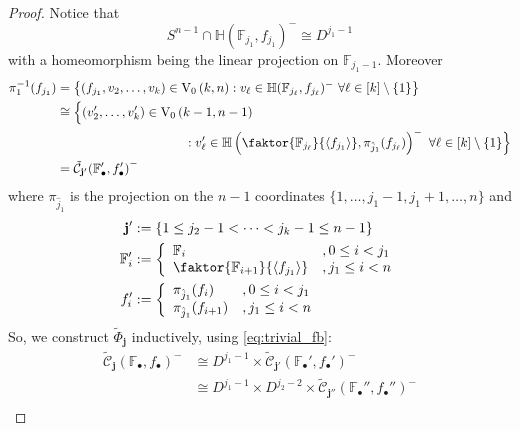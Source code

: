 \begin{proof}
Notice that
\begin{equation}\label{eq:linear_proj_disc}
S^{n-1}\cap\mathbb{H}{\left(\mathbb{F}_{j_1},f_{j_1}\right)}^-\cong D^{j_1-1}
\end{equation}
with a homeomorphism being the linear projection on $\mathbb{F}_{j_1-1}$. Moreover
\begin{align}
\begin{split}
\pi_1^{-1}(f_{j_1})&=\big\{(f_{j_1},v_2,\ldots,v_k)\in\StO{k}{n}:v_{\ell}\in\mathbb{H}(\mathbb{F}_{j_{\ell}},f_{j_{\ell}})^-\ \forall\ell\in[k]\setminus\{1\}\big\}\\
&\cong\Big\{(v'_2,\ldots,v'_k)\in\StO{k-1}{n-1}\\
&\qquad\qquad\qquad\qquad\qquad:v'_{\ell}\in\mathbb{H}\left(\faktor{\mathbb{F}_{j_{\ell}}}{\left<f_{j_1}\right>},\pi_{\hat{j}_1}(f_{j_{\ell}})\right)^-\ \forall\ell\in[k]\setminus\{1\}\Big\}\\
&=\tilde{\mathcal{C}}_{\mathbf{j}'}{\left(\mathbb{F}'_{\bullet},f'_{\bullet}\right)}^-
\end{split}\label{eq:induction_step}
\end{align}
where $\pi_{\hat{j}_1}$ is the projection on the $n-1$ coordinates $\{1,\ldots,j_1-1,j_1+1,\ldots,n\}$ and
\begin{align*}
\mathbf{j}'&:=\{1\leq j_2-1<\cdots<j_k-1\leq n-1\}\\
\mathbb{F}'_i&:=\left\{\begin{array}{ll}\mathbb{F}_i&,0\leq i<j_1\\\faktor{\mathbb{F}_{i+1}}{\left<f_{j_1}\right>}&,j_1\leq i<n\end{array}\right.\\
f'_i&:=\left\{\begin{array}{ll}\pi_{\hat{j}_1}(f_i)&,0\leq i<j_1\\\pi_{\hat{j}_1}(f_{i+1})&,j_1\leq i<n\end{array}\right.
\end{align*}
So, we construct $\tilde{\Phi}_{\mathbf{j}}$ inductively, using \eqref{eq:trivial_fb}:
\begin{align*}
\tilde{\mathcal{C}}_{\mathbf{j}}{\left(\mathbb{F}_{\bullet},f_{\bullet}\right)}^-&\cong D^{j_1-1}\times\tilde{\mathcal{C}}_{\mathbf{j}'}{\left(\mathbb{F}_{\bullet}',f_{\bullet}'\right)}^-\\
&\cong D^{j_1-1}\times D^{j_2-2}\times \tilde{\mathcal{C}}_{\mathbf{j}''}{\left(\mathbb{F}_{\bullet}'',f_{\bullet}''\right)}^-\\

\end{align*}
\end{proof}
